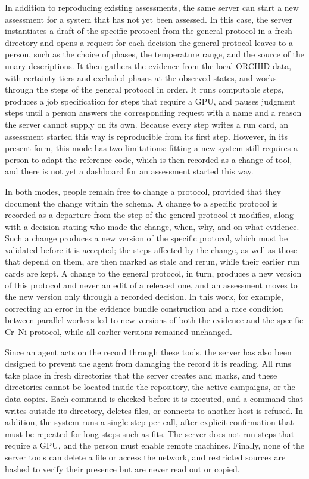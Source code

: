 In addition to reproducing existing assessments, the same server can start a new assessment for a system that has not yet been assessed. In this case, the server instantiates a draft of the specific protocol from the general protocol in a fresh directory and opens a request for each decision the general protocol leaves to a person, such as the choice of phases, the temperature range, and the source of the unary descriptions. It then gathers the evidence from the local ORCHID data, with certainty tiers and excluded phases at the observed states, and works through the steps of the general protocol in order. It runs computable steps, produces a job specification for steps that require a GPU, and pauses judgment steps until a person answers the corresponding request with a name and a reason the server cannot supply on its own. Because every step writes a run card, an assessment started this way is reproducible from its first step. However, in its present form, this mode has two limitations: fitting a new system still requires a person to adapt the reference code, which is then recorded as a change of tool, and there is not yet a dashboard for an assessment started this way.

In both modes, people remain free to change a protocol, provided that they document the change within the schema. A change to a specific protocol is recorded as a departure from the step of the general protocol it modifies, along with a decision stating who made the change, when, why, and on what evidence. Such a change produces a new version of the specific protocol, which must be validated before it is accepted; the steps affected by the change, as well as those that depend on them, are then marked as stale and rerun, while their earlier run cards are kept. A change to the general protocol, in turn, produces a new version of this protocol and never an edit of a released one, and an assessment moves to the new version only through a recorded decision. In this work, for example, correcting an error in the evidence bundle construction and a race condition between parallel workers led to new versions of both the evidence and the specific Cr--Ni protocol, while all earlier versions remained unchanged.

Since an agent acts on the record through these tools, the server has also been designed to prevent the agent from damaging the record it is reading. All runs take place in fresh directories that the server creates and marks, and these directories cannot be located inside the repository, the active campaigns, or the data copies. Each command is checked before it is executed, and a command that writes outside its directory, deletes files, or connects to another host is refused. In addition, the system runs a single step per call, after explicit confirmation that must be repeated for long steps such as fits. The server does not run steps that require a GPU, and the person must enable remote machines. Finally, none of the server tools can delete a file or access the network, and restricted sources are hashed to verify their presence but are never read out or copied.

